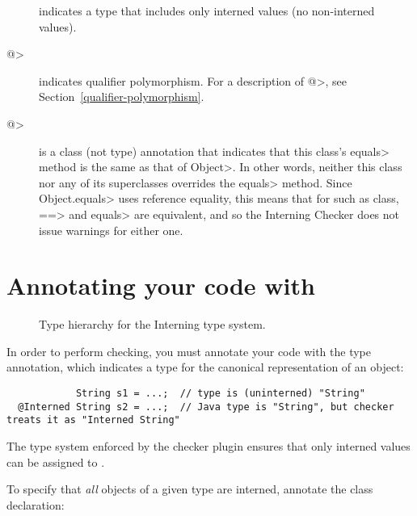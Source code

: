 \begin{description}

\item[]
  indicates a type that includes only interned values (no non-interned
  values).

\item[\<@>]
  indicates qualifier polymorphism.  For a description of
  \<@>, see
  Section~\ref{qualifier-polymorphism}.

\item[\<@>]
  is a class (not type) annotation that indicates that this class's
  \<equals> method is the same as that of \<Object>.  In other words,
  neither this class nor any of its superclasses overrides the \<equals>
  method.  Since \<Object.equals> uses reference equality, this means that
  for such as class, \<==> and \<equals> are equivalent, and so the
  Interning Checker does not issue warnings for either one.

\end{description}


\section{Annotating your code with \label{annotating-with-interned}}

\begin{figure}
\caption{Type hierarchy for the Interning type system.}
\label{fig:interning-hierarchy}
\end{figure}

In order to perform checking, you must annotate your code with the 
type annotation, which indicates a type for the canonical representation of an
object:

\begin{Verbatim}
            String s1 = ...;  // type is (uninterned) "String"
  @Interned String s2 = ...;  // Java type is "String", but checker treats it as "Interned String"
\end{Verbatim}

The type system enforced by the checker plugin ensures that only interned
values can be assigned to .

To specify that \emph{all} objects of a given type are interned, annotate the
class declaration:

